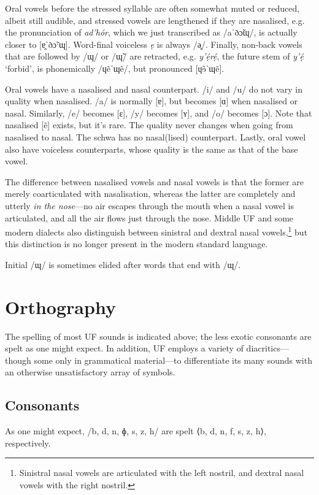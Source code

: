 \documentclass[a4paper, 12pt, twoside, openright, final]{book}
\let \w \textit
\begin{document}
Oral vowels before the stressed syllable are often somewhat muted or reduced, albeit still audible, and stressed vowels are lengthened if they
are nasalised, e.g. the pronunciation of \w{ad’hór}, which we just transcribed as /aˈðɔ̃ɰ/, is actually closer to [ɐ̯ˈðɔ̃ˑɰ].
Word-final voiceless \w{ẹ} is always /ə̥/. Finally, non-back vowels that are followed by /ɰ/ or /ɰ̃/ are retracted, e.g. \w{y’ẹ́rẹ́}, the future
stem of \w{y’ẹ́} ‘forbid’, is phonemically /ɥẽˈɰẽ/, but pronounced [ɥɘ̃ˈɰẽ].

Oral vowels have a nasalised and nasal counterpart. /i/ and /u/ do not vary in quality when na\-sa\-lis\-ed.
/a/ is normally [ɐ], but becomes [ɑ] when nasalised or nasal. Similarly, /e/ becomes [ɛ],
/y/ becomes [ʏ], and /o/ becomes [ɔ]. Note that nasalised [ẽ] exists, but it’s
rare. The quality never changes when going from nasalised to nasal. The schwa has no nasal(lised) counterpart. Lastly, oral vowel
also have voiceless counterparts, whose quality is the same as that of the base vowel.

The difference between nasalised vowels and nasal vowels is that the former are merely coarticulated with nasalisation, whereas
the latter are completely and utterly \textit{in the nose}—no air escapes through the mouth when a nasal vowel is articulated, and all
the air flows just through the nose. Middle UF and some modern dialects also distinguish between sinistral and dextral nasal
vowels,\footnote{Sinistral nasal vowels are articulated with the left nostril, and dextral nasal vowels with the right nostril.}
but this distinction is no longer present in the modern standard language.

Initial /ɰ/ is sometimes elided after words that end with /ɰ/.

\section{Orthography}
The spelling of most UF sounds is indicated above; the less exotic consonants are spelt as
one might expect. In addition, UF employs a variety of diacritics—though some only in grammatical
material—to differentiate its many sounds with an otherwise unsatisfactory array of symbols.

\subsection{Consonants}
As one might expect, /b, d, n, ɸ, s, z, h/ are spelt ⟨b, d, n, f, s, z, h⟩, respectively.
\end{document}
